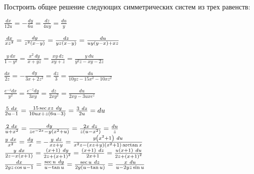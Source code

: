 	Построить общее решение следующих симметрических систем из трех равенств:
	\begin{enumtasks}

		\label{nonlinsys_systodes:symmetrical3}
		\item \( \frac{dx}{12 u} = - \frac{dy}{6 u} = \frac{dz}{4 u y} = \frac{du}{y} \) 																%
		\item \( \frac{dx}{x z^2} = \frac{dy}{z^2 \left( x - y \right)} = \frac{dz}{yz \left( x - y \right)} = \frac{du}{uy \left( y - x \right) + xz} \)					%
		\item \( \frac{y ~ dx}{1 - y^2} = \frac{x^2 ~ dy}{x + yz} = \frac{xy ~ dz}{xy + z} = \frac{y ~ du}{y^2 z - xy - 2z} \)							%
		\item \( \frac{dx}{2 z} = - \frac{dy}{3 x + 2 z^2} = \frac{dz}{3} = \frac{du}{10 yz - 15 x^2 - 10 xz^2} \)										%
		\item \( \frac{e^{- z} dx}{y^2} = \frac{e^{- z} dy}{3xy} = \frac{dz}{2xy^2} = \frac{du}{2xy - 3uxe^z} \)										%
		\item \( \frac{5 ~ dx}{2u - 1} = \frac{15 \sec{xz} ~ dy}{10 u x + z \left( 6 u - 3 \right)} = \frac{3 ~ dz}{2 u} = du \)								%
		\item \( \frac{2 ~ dx}{u + x^2} = \frac{dy}{z e^{-2x} - y \left( x^2 + u \right)} = \frac{2x  ~ dz}{z \left( u - x^2 \right)} = \frac{du}{z} \) 				%
		\itemstar \( \frac{y ~ dx}{x^2} = \frac{dy}{x} = - \frac{y ~ dz}{xz + y} = \frac{y \left( x^2 + 1 \right) ~ du}{x^2 z - \left( x z + y \right) \left( x^2 + 1 \right) \arctan{x}} \)											%
		\itemstar \( \frac{y ~ dx}{2z - x \left( x + 1 \right)} = \frac{\left( x + 1 \right) ~ dy}{2z + \left( x + 1 \right)^2} = \frac{\left( x + 1 \right) ~ dz}{2x + 1} = \frac{u \left( x + 1 \right) ~ du}{2z + \left( x + 1 \right)^2} \) 		%
		\itemstar \( \frac{dx}{2yz \cos{u} - 1} = \frac{\sec{u} ~ dy}{u - \tan{u}} = \frac{\sec{u} ~ dz}{2y \left( u - \tan{u} \right)} = \frac{x ~ du}{u - 2yz \sin{u}} \) 										%

	\end{enumtasks}

